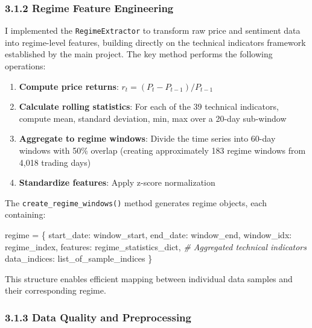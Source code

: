 \documentclass[
]{article}
\newenvironment{Shaded}{}{}
\newcommand{\CommentTok}[1]{\textcolor[rgb]{0.38,0.63,0.69}{\textit{#1}}}
\newcommand{\NormalTok}[1]{#1}
\newcommand{\OperatorTok}[1]{\textcolor[rgb]{0.40,0.40,0.40}{#1}}
\newcommand{\StringTok}[1]{\textcolor[rgb]{0.25,0.44,0.63}{#1}}
\begin{document}
\subsubsection{3.1.2 Regime Feature
Engineering}\label{312-regime-feature-engineering}

I implemented the \texttt{RegimeExtractor} to transform raw price and
sentiment data into regime-level features, building directly on the
technical indicators framework established by the main project. The key
method performs the following operations:

\begin{enumerate}
\def\labelenumi{\arabic{enumi}.}
\item
\textbf{Compute price returns}: $r_t = (P_t - P_{t-1}) / P_{t-1}$
\item
  \textbf{Calculate rolling statistics}: For each of the 39 technical
  indicators, compute mean, standard deviation, min, max over a 20-day
  sub-window
\item
  \textbf{Aggregate to regime windows}: Divide the time series into
  60-day windows with 50\% overlap (creating approximately 183 regime
  windows from 4,018 trading days)
\item
  \textbf{Standardize features}: Apply z-score normalization
\end{enumerate}

The \texttt{create\_regime\_windows()} method generates regime objects,
each containing:

\begin{Shaded}
\begin{Highlighting}[]
\NormalTok{regime }\OperatorTok{=}\NormalTok{ \{}
    \StringTok{\textquotesingle{}start\_date\textquotesingle{}}\NormalTok{: window\_start,}
    \StringTok{\textquotesingle{}end\_date\textquotesingle{}}\NormalTok{: window\_end,}
    \StringTok{\textquotesingle{}window\_idx\textquotesingle{}}\NormalTok{: regime\_index,}
    \StringTok{\textquotesingle{}features\textquotesingle{}}\NormalTok{: regime\_statistics\_dict,  }\CommentTok{\# Aggregated technical indicators}
    \StringTok{\textquotesingle{}data\_indices\textquotesingle{}}\NormalTok{: list\_of\_sample\_indices}
\NormalTok{\}}
\end{Highlighting}
\end{Shaded}

This structure enables efficient mapping between individual data samples
and their corresponding regime.

\subsubsection{3.1.3 Data Quality and
Preprocessing}\label{313-data-quality-and-preprocessing}
\end{document}
